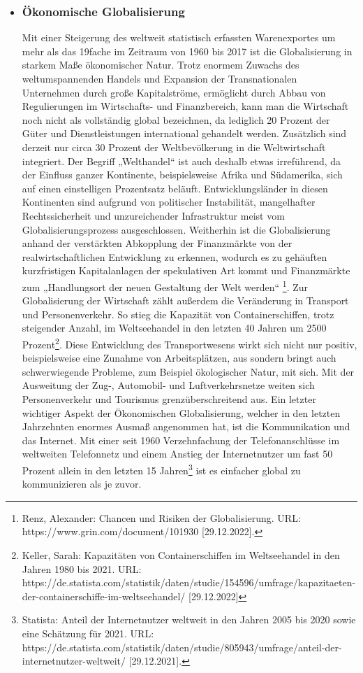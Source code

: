 \documentclass[12pt]{article}
\begin{document}
\begin{itemize}
    \item \subsubsection{Ökonomische Globalisierung}
    Mit einer Steigerung des weltweit statistisch erfassten Warenexportes um mehr als das 19fache im Zeitraum von 1960 bis 2017 ist die Globalisierung in starkem Maße ökonomischer Natur. Trotz enormem Zuwachs des weltumspannenden Handels und Expansion der Transnationalen Unternehmen durch große Kapitalströme, ermöglicht durch Abbau von Regulierungen im Wirtschafts- und Finanzbereich, kann man die Wirtschaft noch nicht als vollständig global bezeichnen, da lediglich 20 Prozent der Güter und Dienstleistungen international gehandelt werden. Zusätzlich sind derzeit nur circa 30 Prozent der Weltbevölkerung in die Weltwirtschaft integriert. Der Begriff „Welthandel“ ist auch deshalb etwas irreführend, da der Einfluss ganzer Kontinente, beispielsweise Afrika und Südamerika, sich auf einen einstelligen Prozentsatz beläuft. Entwicklungsländer in diesen Kontinenten sind aufgrund von politischer Instabilität, mangelhafter Rechtssicherheit und unzureichender Infrastruktur meist vom Globalisierungsprozess ausgeschlossen. Weitherhin ist die Globalisierung anhand der verstärkten Abkopplung der Finanzmärkte von der realwirtschaftlichen Entwicklung zu erkennen, wodurch es zu gehäuften kurzfristigen Kapitalanlagen der spekulativen Art kommt und Finanzmärkte zum „Handlungsort der neuen Gestaltung der Welt werden“ \footnote{Renz, Alexander: Chancen und Risiken der Globalisierung. URL: https://www.grin.com/document/101930 [29.12.2022].}. Zur Globalisierung der Wirtschaft zählt außerdem die Veränderung in Transport und Personenverkehr. So stieg die Kapazität von Containerschiffen, trotz steigender Anzahl, im Weltseehandel in den letzten 40 Jahren um 2500 Prozent\footnote{Keller, Sarah: Kapazitäten von Containerschiffen im Weltseehandel in den Jahren 1980 bis 2021. URL: https://de.statista.com/statistik/daten/studie/154596/umfrage/kapazitaeten-der-containerschiffe-im-weltseehandel/ [29.12.2022]}. Diese Entwicklung des Transportwesens wirkt sich nicht nur positiv, beispielsweise eine Zunahme von Arbeitsplätzen, aus sondern bringt auch schwerwiegende Probleme, zum Beispiel ökologischer Natur, mit sich. Mit der Ausweitung der Zug-, Automobil- und Luftverkehrsnetze weiten sich Personenverkehr und Tourismus grenzüberschreitend aus. Ein letzter wichtiger Aspekt der Ökonomischen Globalisierung, welcher in den letzten Jahrzehnten enormes Ausmaß angenommen hat, ist die Kommunikation und das Internet. Mit einer seit 1960 Verzehnfachung der Telefonanschlüsse im weltweiten Telefonnetz und einem Anstieg der Internetnutzer um fast 50 Prozent allein in den letzten 15 Jahren\footnote{Statista: Anteil der Internetnutzer weltweit in den Jahren 2005 bis 2020 sowie eine Schätzung für 2021. URL: https://de.statista.com/statistik/daten/studie/805943/umfrage/anteil-der-internetnutzer-weltweit/ [29.12.2021].} ist es einfacher global zu kommunizieren als je zuvor.

\end{itemize}
\end{document}

